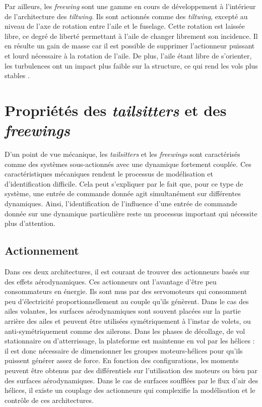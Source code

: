         Par ailleurs, les \textit{freewing} sont une gamme en cours de développement à l'intérieur de l'architecture des \textit{tiltwing}. Ils sont actionnés comme des \textit{tiltwing}, excepté au niveau de l'axe de rotation entre l'aile et le fuselage. Cette rotation est laissée libre, ce degré de liberté permettant à l'aile de changer librement son incidence. Il en résulte un gain de masse car il est possible de supprimer l'actionneur puissant et lourd nécessaire à la rotation de l'aile. De plus, l'aile étant libre de s'orienter, les turbulences ont un impact plus faible sur la structure, ce qui rend les vols plus stables \cite{freewing2012, Johnson2021, Johnson2023}. 


\section{Propriétés des \textit{tailsitters} et des \textit{freewings}}
    D'un point de vue mécanique, les \textit{tailsitters} et les \textit{freewings} sont caractérisés comme des systèmes sous-actionnés avec une dynamique fortement couplée. Ces caractéristiques mécaniques rendent le processus de modélisation et d'identification difficile. Cela peut s'expliquer par le fait que, pour ce type de système, une entrée de commande donnée agit simultanément sur différentes dynamiques. Ainsi, l'identification de l'influence d'une entrée de commande donnée sur une dynamique particulière reste un processus important qui nécessite plus d'attention.
    \subsection{Actionnement}
    Dans ces deux architectures, il est courant de trouver des actionneurs basés sur des effets aérodynamiques. Ces actionneurs ont l'avantage d'être peu consommateurs en énergie. Ils sont mus par des servomoteurs qui consomment peu d'électricité proportionnellement au couple qu'ils génèrent. Dans le cas des ailes volantes, les surfaces aérodynamiques sont souvent placées sur la partie arrière des ailes et peuvent être utilisées symétriquement à l'instar de volets, ou anti-symétriquement comme des ailerons. 
    Dans les phases de décollage, de vol stationnaire ou d'atterrissage, la plateforme est maintenue en vol par les hélices : il est donc nécessaire de dimensionner les groupes moteurs-hélices pour qu'ils puissent générer assez de force. En fonction des configurations, les moments peuvent être obtenus par des différentiels sur l'utilisation des moteurs ou bien par des surfaces aérodynamiques. Dans le cas de surfaces soufflées par le flux d'air des hélices, il existe un couplage des actionneurs qui complexifie la modélisation et le contrôle de ces architectures.


